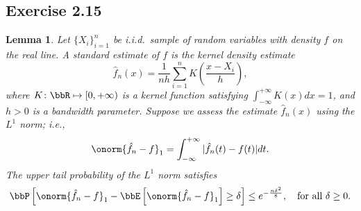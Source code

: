 \documentclass[11pt]{article}
\newcommand{\of}[1]{\left(#1\right)}
\newcommand{\off}[1]{\left[#1\right]}
\theoremstyle{plain}
\newtheorem{lem}{Lemma}
\theoremstyle{definition}
\begin{document}
	\subsection{Exercise 2.15}
	\begin{lem}
		Let $\{X_i\}_{i=1}^n$ be i.i.d.\ sample of random variables with density $f$ on the real line. A standard estimate of $f$ is the kernel density estimate 
		\begin{equation}
			\hat f_n (x) = \frac{1}{nh} \sum_{i=1}^n  K\of{ \frac{x- X_i}{h} },
		\end{equation}
		where $K \colon \bbR \mapsto [0,+\infty )$ is a kernel function satisfying $\int_{-\infty}^{+\infty} K(x) dx = 1$, and $h > 0$ is a bandwidth parameter. Suppose we assess the estimate $\hat f_n (x)$ using the $L^1$ norm; i.e.,
		\[ \onorm{\hat f_n - f}_1 = \int_{-\infty}^{+\infty} |\hat f_n(t) - f(t)|dt. \]
		The upper tail probability of the $L^1$ norm satisfies
		\begin{equation}
			\bbP\off{\onorm{\hat f_n - f}_1 - \bbE \off{\onorm{\hat f_n - f}_1}\geq \delta} \leq e^{-\frac{n\delta^2}{8}},\quad \text{for all } \delta \geq 0.
		\end{equation}
	\end{lem}
	
\end{document}
